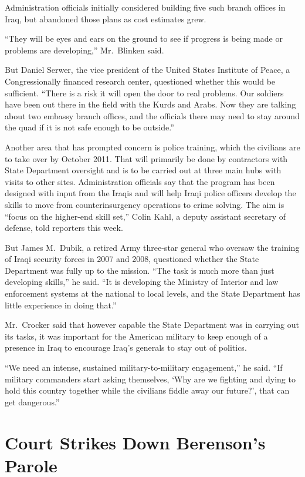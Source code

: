 ﻿\documentclass[12pt]{article}
\begin{document}
Administration officials initially considered building five such branch offices in Iraq, but
abandoned those plans as cost estimates grew.

``They will be eyes and ears on the ground to see if progress is being made or problems are
developing,'' Mr.~Blinken said.

But Daniel Serwer, the vice president of the United States Institute of Peace, a Congressionally
financed research center, questioned whether this would be sufficient. ``There is a risk it will
open the door to real problems. Our soldiers have been out there in the field with the Kurds and
Arabs. Now they are talking about two embassy branch offices, and the officials there may need to
stay around the quad if it is not safe enough to be outside.''

Another area that has prompted concern is police training, which the civilians are to take over by
October 2011. That will primarily be done by contractors with State Department oversight and is to
be carried out at three main hubs with visits to other sites. Administration officials say that the
program has been designed with input from the Iraqis and will help Iraqi police officers develop the
skills to move from counterinsurgency operations to crime solving. The aim is ``focus on the
higher-end skill set,'' Colin Kahl, a deputy assistant secretary of defense, told reporters this
week.

But James M.~Dubik, a retired Army three-star general who oversaw the training of Iraqi security
forces in 2007 and 2008, questioned whether the State Department was fully up to the mission. ``The
task is much more than just developing skills,'' he said. ``It is developing the Ministry of
Interior and law enforcement systems at the national to local levels, and the State Department has
little experience in doing that.''

Mr.~Crocker said that however capable the State Department was in carrying out its tasks, it was
important for the American military to keep enough of a presence in Iraq to encourage Iraq's
generals to stay out of politics.

``We need an intense, sustained military-to-military engagement,'' he said. ``If military commanders
start asking themselves, `Why are we fighting and dying to hold this country together while the
civilians fiddle away our future?', that can get dangerous.''

\section{Court Strikes Down Berenson's Parole}
\end{document}
